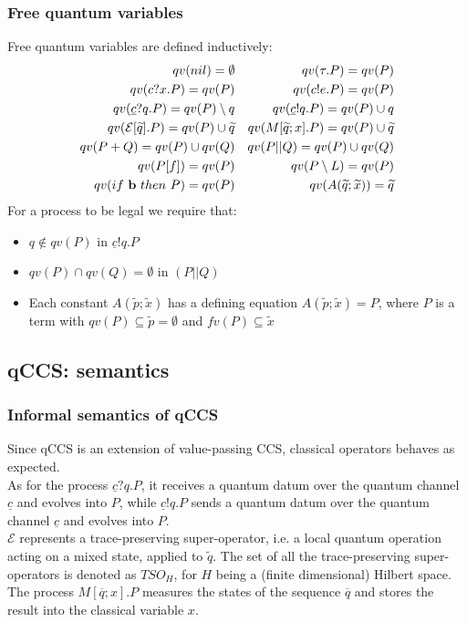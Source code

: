 \documentclass{beamer}
\begin{document}
\begin{frame}
\frametitle{Free quantum variables}
Free quantum variables are defined inductively:
	\begin{align*}
		qv(nil) = \emptyset && qv(\tau.P) = qv(P)\\
		qv(c?x.P) = qv(P) && qv(c!e.P) = qv(P)\\
		qv(\underline{c}?q.P) = qv(P) \setminus {q} && 
		qv(\underline{c}!q.P) = qv(P) \cup {q}\\
		qv(\mathcal{E}[\widetilde{q}].P) = qv(P) \cup \widetilde{q} &&
		qv(M[\widetilde{q};x].P) = qv(P) \cup \widetilde{q}\\
		qv(P + Q) = qv(P) \cup qv(Q) && qv(P \lvert \rvert Q) = qv(P) \cup qv(Q)\\
		qv(P[f]) = qv(P) && qv(P \setminus L) = qv(P)\\
		qv(if \ \bold{b} \ then \ P) = qv(P) &&
		qv(A(\widetilde{q};\widetilde{x})) = \widetilde{q}		
	\end{align*}
For a process to be legal we require that:
	\begin{itemize}
		\item $q \not \in qv(P)$ in $\underline{c}!q.P$
		\item $qv(P) \cap qv(Q) = \emptyset$ in $(P \lvert \rvert Q)$
		\item Each constant $A(\widetilde{p};\widetilde{x})$ has a defining equation
		$A(\widetilde{p};\widetilde{x}) = P$, where $P$ is a term with
		$qv(P) \subseteq \widetilde{p} = \emptyset$ and $fv(P) \subseteq \widetilde{x}$
	\end{itemize}
\end{frame}

\subsection{qCCS: semantics}

\begin{frame}
\frametitle{Informal semantics of qCCS}
Since qCCS is an extension of value-passing CCS, classical operators behaves as expected. \\
As for the process $\underline{c}?q.P$, it receives a quantum datum over the quantum channel $\underline{c}$ and evolves into $P$, while $\underline{c}!q.P$ sends a quantum datum over the quantum channel $\underline{c}$ and evolves into $P$. \\
$\mathcal{E}$ represents a trace-preserving super-operator, i.e. a local quantum operation acting on a mixed state, applied to $\widetilde{q}$. The set of all the trace-preserving super-operators is denoted as $TSO_H$, for $H$ being a (finite dimensional) Hilbert 
space. \\
The process $M[\overline{q};x].P$ measures the states of the sequence $\overline{q}$ and stores the result into the classical variable $x$. \\
\end{frame}
 
\end{document}
